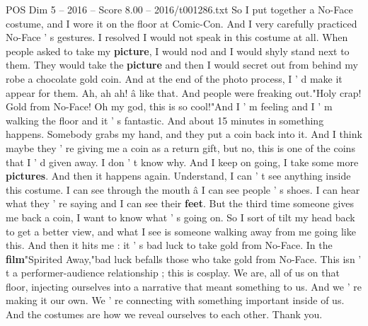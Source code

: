 \begin{textsample}{POS Dim 5 – 2016 – Score 8.00 – 2016/t001286.txt}
So I put together a No-Face costume, and I wore it on the floor at Comic-Con.
And I very carefully practiced No-Face ' s gestures.
I resolved I would not speak in this costume at all.
When people asked to take my \textbf{picture}, I would nod and I would shyly stand next to them.
They would take the \textbf{picture} and then I would secret out from behind my robe a chocolate gold coin.
And at the end of the photo process, I ' d make it appear for them.
Ah, ah ah! â like that.
And people were freaking out."Holy crap!
Gold from No-Face!
Oh my god, this is so cool!"And I ' m feeling and I ' m walking the floor and it ' s fantastic.
And about 15 minutes in something happens.
Somebody grabs my hand, and they put a coin back into it.
And I think maybe they ' re giving me a coin as a return gift, but no, this is one of the coins that I ' d given away.
I don ' t know why.
And I keep on going, I take some more \textbf{pictures}.
And then it happens again.
Understand, I can ' t see anything inside this costume.
I can see through the mouth â I can see people ' s shoes.
I can hear what they ' re saying and I can see their \textbf{feet}.
But the third time someone gives me back a coin, I want to know what ' s going on.
So I sort of tilt my head back to get a better view, and what I see is someone walking away from me going like this.
And then it hits me : it ' s bad luck to take gold from No-Face.
In the \textbf{film}"Spirited Away,"bad luck befalls those who take gold from No-Face.
This isn ' t a performer-audience relationship ; this is cosplay.
We are, all of us on that floor, injecting ourselves into a narrative that meant something to us.
And we ' re making it our own.
We ' re connecting with something important inside of us.
And the costumes are how we reveal ourselves to each other.
Thank you.

\end{textsample}
